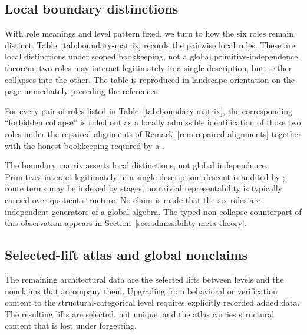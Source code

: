 \subsection{Local boundary distinctions}\label{subsec:boundary-matrix}

With role meanings and level pattern fixed, we turn to how the six
roles remain distinct. Table~\ref{tab:boundary-matrix} records the
pairwise local rules. These are local distinctions under scoped
bookkeeping, not a global primitive-independence theorem: two roles
may interact legitimately in a single description, but neither
collapses into the other. The table is reproduced in landscape
orientation on the page immediately preceding the references.

\begin{proposition}\label{prop:boundary-distinctions}
For every pair of roles listed in Table~\ref{tab:boundary-matrix}, the
corresponding ``forbidden collapse'' is ruled out as a locally admissible
identification of those two roles under the repaired alignments of
Remark~\ref{rem:repaired-alignments} together with the honest bookkeeping
required by a \FATCD{}.
\end{proposition}

\begin{remark}\label{rem:not-global-independence}
The boundary matrix asserts local distinctions, not global
independence. Primitives interact legitimately in a single
description: \Pone{} descent is audited by \Psix{}; \Pthree{} route
terms may be indexed by \Pfour{} stages; nontrivial \Ptwo{}
representability is typically carried over \Pfive{} quotient structure.
No claim is made that the six roles are independent generators of a
global algebra. The typed-non-collapse counterpart of this observation
appears in Section~\ref{sec:admissibility-meta-theory}.
\end{remark}

\subsection{Selected-lift atlas and global nonclaims}\label{subsec:lift-atlas}

The remaining architectural data are the selected lifts between levels
and the nonclaims that accompany them. Upgrading from behavioral or
verification content to the structural-categorical level requires
explicitly recorded added data. The resulting lifts are selected, not
unique, and the atlas carries structural content that is lost under
forgetting.

